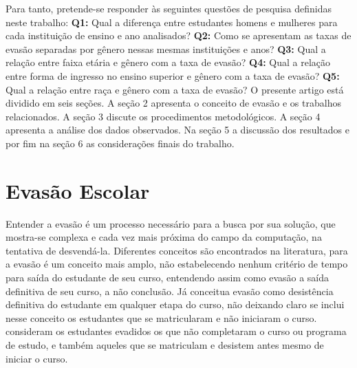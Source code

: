 \documentclass[a4paper]{article}
\begin{document}
Para tanto, pretende-se responder às seguintes questões de pesquisa definidas neste trabalho: \textbf{Q1:} Qual a diferença entre estudantes homens e mulheres para cada instituição de ensino e ano analisados? \textbf{Q2:} Como se apresentam as taxas de evasão separadas por gênero nessas mesmas instituições e anos? \textbf{Q3:} Qual a relação entre faixa etária e gênero com a taxa de evasão? \textbf{Q4:} Qual a relação entre forma de ingresso no ensino superior e gênero com a taxa de evasão? \textbf{Q5:} Qual a relação entre raça e gênero com a taxa de evasão? O presente artigo está dividido em seis seções. A seção 2 apresenta o conceito de evasão e os trabalhos relacionados. A seção 3 discute os procedimentos metodológicos. A seção 4 apresenta a análise dos dados observados. Na seção 5 a discussão dos resultados e por fim na seção 6 as considerações finais do trabalho. 


\section{Evasão Escolar} 
Entender a evasão é um processo necessário para a busca por sua solução, que mostra-se complexa e cada vez mais próxima do campo da computação, na tentativa de desvendá-la. Diferentes conceitos são encontrados na literatura, para  a evasão é um conceito mais amplo, não estabelecendo nenhum critério de tempo para saída do estudante de seu curso, entendendo assim como evasão a saída definitiva de seu curso, a não conclusão. Já  conceitua evasão como desistência definitiva do estudante em qualquer etapa do curso, não deixando claro se inclui nesse conceito os estudantes que se matricularam e não iniciaram o curso.  consideram os estudantes evadidos os que não completaram o curso ou programa de estudo, e também aqueles que se matriculam e desistem antes mesmo de iniciar o curso.
\end{document}
